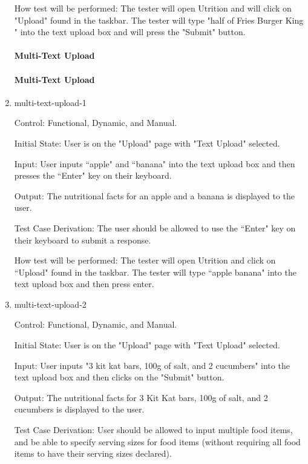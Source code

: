 \documentclass[12pt, titlepage]{article}
\begin{document}
\begin{enumerate}
	How test will be performed: The tester will open Utrition and will click on "Upload" found in the taskbar. The tester will type "half of Fries Burger King
	" into the text upload box and will press the "Submit" button.
	
	\paragraph{Multi-Text Upload}
	\paragraph{Multi-Text Upload}
	
	\item{multi-text-upload-1\\}
	
	Control: Functional, Dynamic, and Manual.
	
	Initial State: User is on the "Upload" page with "Text Upload" selected.
	
	Input: User inputs ``apple" and ``banana" into the text upload box and then presses the ``Enter" key on their keyboard.
	
	Output: The nutritional facts for an apple and a banana is displayed to the user.
	
	Test Case Derivation: The user should be allowed to use the ``Enter" key on their keyboard to submit a response.
	
	How test will be performed: The tester will open Utrition and click on ``Upload" found in the taskbar. The tester will type ``apple banana" into the text upload box and then press enter. 
	
	\item{multi-text-upload-2\\}
	
	Control: Functional, Dynamic, and Manual.
	
	Initial State: User is on the "Upload" page with "Text Upload" selected.
	
	Input: User inputs "3 kit kat bars, 100g of salt, and 2 cucumbers" into the text upload box and then clicks on the "Submit" button.
	
	Output: The nutritional facts for 3 Kit Kat bars, 100g of salt, and 2 cucumbers is displayed to the user.
	
	Test Case Derivation: User should be allowed to input multiple food items, and be able to specify serving sizes for food items (without requiring all food items to have their serving sizes declared).
	

\end{enumerate}
\end{document}
